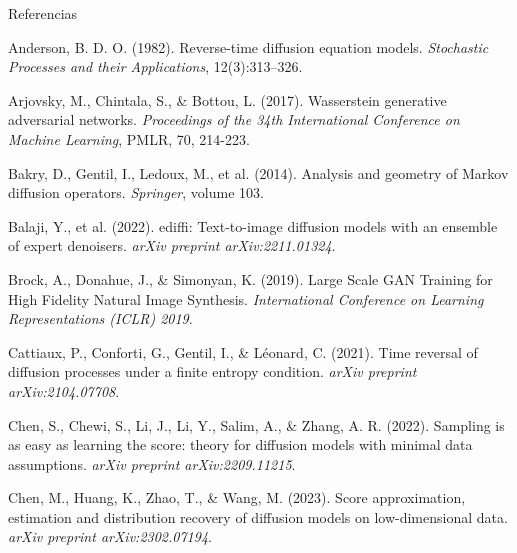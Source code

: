 \documentclass[aspectratio=169,xcolor=dvipsnames, t, spanish]{beamer}
\begin{document}
\begin{frame}{Referencias}
    \footnotesize{
        \begin{thebibliography}{99}

             Anderson, B. D. O. (1982).
            \newblock Reverse-time diffusion equation models.
            \newblock \emph{Stochastic Processes and their Applications}, 12(3):313–326.
            
             Arjovsky, M., Chintala, S., \& Bottou, L. (2017).
            \newblock Wasserstein generative adversarial networks.
            \newblock \emph{Proceedings of the 34th International Conference on Machine Learning}, PMLR, 70, 214-223.

             Bakry, D., Gentil, I., Ledoux, M., et al. (2014).
            \newblock Analysis and geometry of Markov diffusion operators.
            \newblock \emph{Springer}, volume 103.

             Balaji, Y., et al. (2022).
            \newblock ediffi: Text-to-image diffusion models with an ensemble of expert denoisers.
            \newblock \emph{arXiv preprint arXiv:2211.01324}.

             Brock, A., Donahue, J., \& Simonyan, K. (2019).
            \newblock Large Scale GAN Training for High Fidelity Natural Image Synthesis.
            \newblock \emph{International Conference on Learning Representations (ICLR) 2019}.

             Cattiaux, P., Conforti, G., Gentil, I., \& Léonard, C. (2021).
            \newblock Time reversal of diffusion processes under a finite entropy condition.
            \newblock \emph{arXiv preprint arXiv:2104.07708}.

             Chen, S., Chewi, S., Li, J., Li, Y., Salim, A., \& Zhang, A. R. (2022).
            \newblock Sampling is as easy as learning the score: theory for diffusion models with minimal data assumptions.
            \newblock \emph{arXiv preprint arXiv:2209.11215}.

             Chen, M., Huang, K., Zhao, T., \& Wang, M. (2023).
            \newblock Score approximation, estimation and distribution recovery of diffusion models on low-dimensional data.
            \newblock \emph{arXiv preprint arXiv:2302.07194}.


\end{thebibliography}}
\end{frame}
\end{document}

